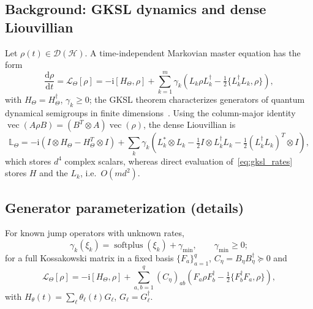 \documentclass[11pt]{article}
\DeclareMathOperator{\softplus}{softplus}
\newcommand{\calD}{\mathcal{D}}
\newcommand{\calL}{\mathcal{L}}
\newcommand{\dd}{\mathrm{d}}
\newcommand{\ii}{\mathrm{i}}
\newcommand{\hilb}{\mathcal{H}}
\begin{document}
\subsection{Background: GKSL dynamics and dense Liouvillian}
\label{sec:gksl}
Let $\rho(t)\in\calD(\hilb)$. A time-independent Markovian master equation has the form
\begin{equation}
    \frac{\dd\rho}{\dd t}=\calL_\Theta[\rho]=-\ii[H_\Theta,\rho]+\sum_{k=1}^{m}\gamma_k\!\left(L_k\rho L_k^\dagger-\tfrac12\{L_k^\dagger L_k,\rho\}\right),
    \label{eq:gksl_rates}
\end{equation}
with $H_\Theta=H_\Theta^\dagger$, $\gamma_k\ge0$; the GKSL theorem characterizes generators of quantum dynamical semigroups in finite dimensions~\cite{lindblad1976generators,gorini1976completely,breuer2002theory,wiseman2009quantum}. Using the column-major identity $\operatorname{vec}(A\rho B)=(B^T\otimes A)\operatorname{vec}(\rho)$, the dense Liouvillian is
\begin{equation}
    \mathbb{L}_\Theta=-\ii(I\otimes H_\Theta-H_\Theta^T\otimes I)+\sum_k\gamma_k\!\left(L_k^*\otimes L_k-\tfrac12 I\otimes L_k^\dagger L_k-\tfrac12 (L_k^\dagger L_k)^T\otimes I\right),
    \label{eq:dense_liouvillian}
\end{equation}
which stores $d^4$ complex scalars, whereas direct evaluation of~\eqref{eq:gksl_rates} stores $H$ and the $L_k$, i.e.\ $O(md^2)$.

\subsection{Generator parameterization (details)}
\label{sec:generator_parameterization}
For known jump operators with unknown rates,
\begin{equation}
    \gamma_k(\xi_k)=\softplus(\xi_k)+\gamma_{\min},\qquad\gamma_{\min}\ge0;
    \label{eq:softplus_rates}
\end{equation}
for a full Kossakowski matrix in a fixed basis $\{F_a\}_{a=1}^{q}$, $C_\eta=B_\eta B_\eta^\dagger\succeq0$ and
\begin{equation}
    \calL_\Theta[\rho]=-\ii[H_\Theta,\rho]+\sum_{a,b=1}^{q}(C_\eta)_{ab}\!\left(F_a\rho F_b^\dagger-\tfrac12\{F_b^\dagger F_a,\rho\}\right),
    \label{eq:kossakowski_generator}
\end{equation}
with $H_\theta(t)=\sum_\ell\theta_\ell(t)G_\ell$, $G_\ell=G_\ell^\dagger$.
\end{document}

